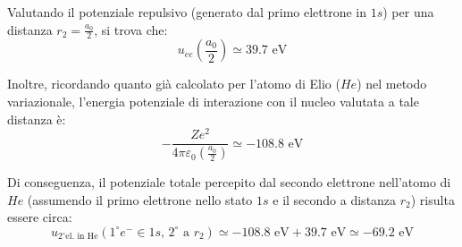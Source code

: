 \begin{exercise}
Valutando il potenziale repulsivo (generato dal primo elettrone in \( 1s \)) per una distanza \( r_2 = \frac{a_0}{2} \), si trova che:
\begin{equation}
    u_{ee}\left(\frac{a_0}{2}\right) \simeq 39.7 \text{ eV}
\end{equation}

Inoltre, ricordando quanto già calcolato per l'atomo di Elio (\( He \)) nel metodo variazionale, l'energia potenziale di interazione con il nucleo valutata a tale distanza è:
\begin{equation}
    -\frac{Z e^2}{4\pi\varepsilon_0 \left(\frac{a_0}{2}\right)} \simeq -108.8 \text{ eV}
\end{equation}

Di conseguenza, il potenziale totale percepito dal secondo elettrone nell'atomo di \( He \) (assumendo il primo elettrone nello stato \( 1s \) e il secondo a distanza \( r_2 \)) risulta essere circa:
\begin{equation}
    u_{2^\circ \text{el. in He}} (1^\circ e^- \in 1s, \, 2^\circ \text{ a } r_2) \simeq -108.8 \text{ eV} + 39.7 \text{ eV} \simeq -69.2 \text{ eV}
\end{equation}
\end{exercise}

